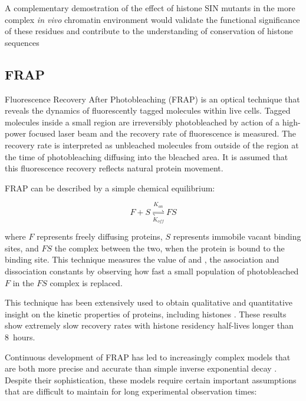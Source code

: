     A complementary demostration of the effect of histone SIN mutants
    in the more complex \textit{in vivo} chromatin environment would
    validate the functional significance of these residues
    and contribute to the understanding of conservation of histone sequences

  \subsection{FRAP}

    Fluorescence Recovery After Photobleaching (FRAP) is an optical technique
    that reveals the dynamics of fluorescently tagged molecules within live cells.
    Tagged molecules inside a small region are irreversibly photobleached by
    action of a high-power focused laser beam and the recovery rate of fluorescence
    is measured. The recovery rate is interpreted as unbleached molecules
    from outside of the region at the time of photobleaching diffusing into the bleached area.
    It is assumed that this fluorescence recovery reflects natural protein movement.

    FRAP can be described by a simple chemical equilibrium:

    \begin{displaymath}
      F + S \overset{K_{on}}{\underset{K_{off}}{\rightleftharpoons}} FS
    \end{displaymath}

    where $F$ represents freely diffusing proteins, $S$ represents immobile vacant
    binding sites, and $FS$ the complex between the two, when the protein is bound
    to the binding site. This technique measures the value of \Kon{} and \Koff{},
    the association and dissociation constants by observing how fast a
    small population of photobleached $F$ in the $FS$ complex is replaced.

    This technique has been extensively used to obtain qualitative and quantitative
    insight on the kinetic properties of proteins, including histones \citep{KimuraCook}.
    These results show extremely slow recovery rates
    with histone residency half-lives longer than 8~hours.


    Continuous development of FRAP has led to increasingly complex models
    that are both more precise and accurate than simple inverse exponential decay .
    Despite their sophistication, these models require certain important assumptions
    that are difficult to maintain for long experimental observation times:

